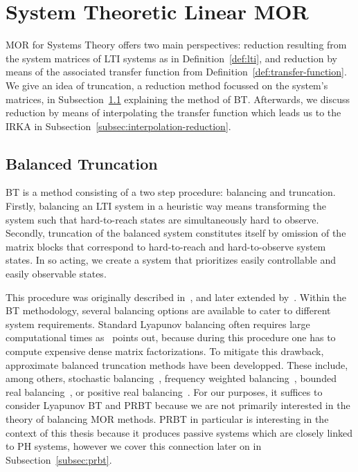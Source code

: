 \section{System Theoretic Linear MOR}\label{sec:system-mor}

\acl{MOR} for Systems Theory offers two main perspectives: reduction resulting from the system matrices of \ac{LTI} systems as in Definition~\ref{def:lti}, and reduction by means of the associated transfer function from Definition~\ref{def:transfer-function}.
We give an idea of truncation, a reduction method focussed on the system's matrices, in Subsection~\ref{subsec:balanced-truncation} explaining the method of \acf{BT}.
Afterwards, we discuss reduction by means of interpolating the transfer function which leads us to the \acf{IRKA} in Subsection~\ref{subsec:interpolation-reduction}.

\subsection{Balanced Truncation}\label{subsec:balanced-truncation}

\acl{BT} is a method consisting of a two step procedure: balancing and truncation.
Firstly, balancing an \ac{LTI} system in a heuristic way means transforming the system such that hard-to-reach states are simultaneously hard to observe.
Secondly, truncation of the balanced system constitutes itself by omission of the matrix blocks that correspond to hard-to-reach and hard-to-observe system states.
In so acting, we create a system that prioritizes easily controllable and easily observable states.

This procedure was originally described in~\cite{Mullis1976}, and later extended by~\cite{Moore1981, Enns1984}.
Within the \ac{BT} methodology, several balancing options are available to cater to different system requirements.
Standard Lyapunov balancing often requires large computational times as~\cite{Gugercin2007} points out, because during this procedure one has to compute expensive dense matrix factorizations.
To mitigate this drawback, approximate balanced truncation methods have been developped.
These include, among others, stochastic balancing~\cite{Desai1984, Green1988}, frequency weighted balancing~\cite{Enns1984, Wang1999}, bounded real balancing~\cite{Opdenacker1988, Reis2009}, or positive real balancing~\cite{Desai1984, Ober1991}.
For our purposes, it suffices to consider Lyapunov \ac{BT} and \ac{PRBT} because we are not primarily interested in the theory of balancing \ac{MOR} methods.
\ac{PRBT} in particular is interesting in the context of this thesis because it produces passive systems which are closely linked to \ac{PH} systems, however we cover this connection later on in Subsection~\ref{subsec:prbt}.

